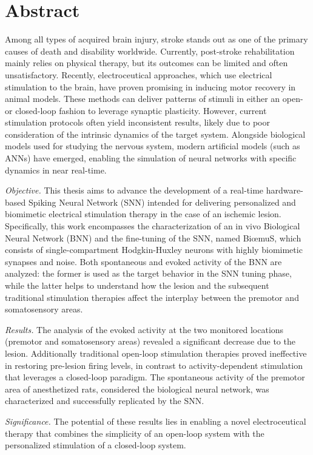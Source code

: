 \chapter*{Abstract}

Among all types of acquired brain injury, stroke stands out as one of the primary causes of death and disability worldwide. Currently, post-stroke rehabilitation mainly relies on physical therapy, but its outcomes can be limited and often unsatisfactory. Recently, electroceutical approaches, which use electrical stimulation to the brain, have proven promising in inducing motor recovery in animal models. These methods can deliver patterns of stimuli in either an open- or closed-loop fashion to leverage synaptic plasticity. However, current stimulation protocols often yield inconsistent results, likely due to poor consideration of the intrinsic dynamics of the target system. Alongside biological models used for studying the nervous system, modern artificial models (such as ANNs) have emerged, enabling the simulation of neural networks with specific dynamics in near real-time.
\bigskip

\textit{Objective.} This thesis aims to advance the development of a real-time hardware-based Spiking Neural Network (SNN) intended for delivering personalized and biomimetic electrical stimulation therapy in the case of an ischemic lesion. Specifically, this work encompasses the characterization of an in vivo Biological Neural Network (BNN) and the fine-tuning of the SNN, named Bi{\oe}muS, which consists of single-compartment Hodgkin-Huxley neurons with highly biomimetic synapses and noise. Both spontaneous and evoked activity of the BNN are analyzed: the former is used as the target behavior in the SNN tuning phase, while the latter helps to understand how the lesion and the subsequent traditional stimulation therapies affect the interplay between the premotor and somatosensory areas.
\bigskip

\textit{Results.} The analysis of the evoked activity at the two monitored locations (premotor and somatosensory areas) revealed a significant decrease due to the lesion. Additionally traditional open-loop stimulation therapies proved ineffective in restoring pre-lesion firing levels, in contrast to activity-dependent stimulation that leverages a closed-loop paradigm. The spontaneous activity of the premotor area of anesthetized rats, considered the biological neural network, was characterized and successfully replicated by the SNN. 
\bigskip

\textit{Significance.} The potential of these results lies in enabling a novel electroceutical therapy that combines the simplicity of an open-loop system with the personalized stimulation of a closed-loop system.
